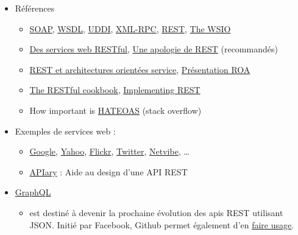 \begin{itemize}
\tightlist
\item
  Références

  \begin{itemize}
  \tightlist
  \item
    \href{https://www.w3.org/TR/soap/}{SOAP},
    \href{https://www.w3.org/2002/ws/desc/}{WSDL},
    \href{http://uddi.xml.org/}{UDDI},
    \href{http://xmlrpc.scripting.com/default.html}{XML-RPC},
    \href{http://www.ics.uci.edu/~fielding/pubs/dissertation/top.htm}{REST},
    \href{http://www.oasis-ws-i.org/}{The WSIO}
  \item
    \href{https://larlet.fr/david/biologeek/archives/20070629-architecture-orientee-ressource-pour-faire-des-services-web-restful/}{Des
    services web RESTful},
    \href{https://web.archive.org/web/20160310205502/http://home.ccil.org/~cowan/restws.pdf}{Une
    apologie de REST} (recommandés)
  \item
    \href{http://www.figer.com/Publications/SOA.htm}{REST et
    architectures orientées service},
    \href{http://fr.slideshare.net/samijaber/symposium-dng-2008-roa}{Présentation
    ROA}
  \item
    \href{http://restcookbook.com/}{The RESTful cookbook},
    \href{https://code.google.com/archive/p/implementing-rest/wikis}{Implementing
    REST}
  \item
    How important is
    \href{http://stackoverflow.com/questions/20335967/how-useful-important-is-rest-hateoas-maturity-level-3}{HATEOAS}
    (stack overflow)
  \end{itemize}
\item
  Exemples de services web :

  \begin{itemize}
  \tightlist
  \item
    \href{https://developers.google.com/products/}{Google},
    \href{https://developer.yahoo.com/everything.html}{Yahoo},
    \href{https://www.flickr.com/services/api/}{Flickr},
    \href{https://dev.twitter.com/overview/api}{Twitter},
    \href{http://uwa.netvibes.com/docs/Uwa/html/index.html}{Netvibe},
    \ldots{}
  \item
    \href{https://apiary.io/}{APIary} : Aide au design d'une API REST
  \end{itemize}
\item
  \href{http://graphql.org/}{GraphQL}

  \begin{itemize}
  \tightlist
  \item
    est destiné à devenir la prochaine évolution des apis REST utilisant
    JSON. Initié par Facebook, Github permet également d'en
    \href{https://developer.github.com/early-access/graphql/}{faire
    usage}.
  \end{itemize}
\end{itemize}

